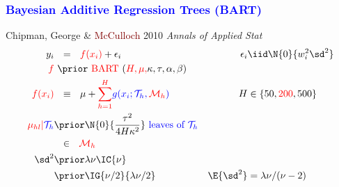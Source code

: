 \documentclass[11pt,dvipsnames,usenames,times]{beamer}
\newcommand*{\BART}{\mathrm{BART}\ }
\begin{document}
\begin{frame}
\boldmath
\frametitle{\bf\textcolor{blue}{Bayesian Additive Regression Trees (BART)}}

Chipman, George \&  \textcolor{Maroon}{McCulloch} 2010 {\it Annals of Applied Stat}\\


\begin{align*}
y_i&\ \ =\ \  \textcolor{red}{f(x_i)} + \epsilon_i &  \epsilon_i & \iid \N{0}{w_i^2 \sd^2}\\
\textcolor{red}{f} &\ \prior\ \textcolor{red}{\BART}(\textcolor{red}{H,\mu,} \kappa, \tau, \alpha, \beta) \\
\textcolor{red}{f(x_i)} &\ \ \equiv\ \ \mu+\textcolor{red}{\sum_{h=1}^H} \textcolor{blue}{g(x_i; \mathcal{T}_h, \textcolor{red}{\mathcal{M}_h})} & 
H & \in \{50, \textcolor{red}{200}, 500\} \\ %
\textcolor{red}{\mu_{hl}|}\textcolor{blue}{\mathcal{T}_h} & \prior \N{0}{\frac{\tau^2}{4H\kappa^2 }} 
\textcolor{blue}{\mbox{\ leaves of\ }{\mathcal{T}}_h} \\
&\ \ \in\ \ \textcolor{red}{\mathcal{M}_h} \\
{\sd^2}& \prior \lambda\nu\IC{\nu}  \\ 
& \prior \IG{\nu/2}{\lambda\nu/2}  & \E{\sd^2} & = \lambda\nu/(\nu-2) \\ 
\end{align*}
\end{frame}
\end{document}
